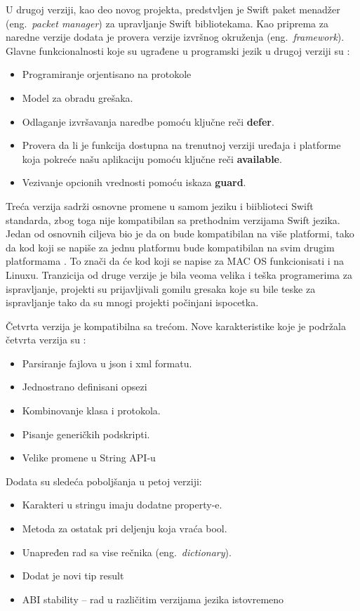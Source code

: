 \documentclass[a4paper]{article}
\begin{document}
U drugoj verziji, kao deo novog projekta, predstvljen je Swift paket menadžer (eng.~{\em packet manager}) za upravljanje Swift bibliotekama. Kao priprema za naredne verzije dodata je provera verzije izvršnog okruženja (eng.~{\em framework}). Glavne funkcionalnosti koje su ugrađene u programski jezik u drugoj verziji su \cite{swiftdev_sajt}:
\begin{itemize}
\item Programiranje orjentisano na protokole
\item Model za obradu grešaka.
\item Odlaganje izvršavanja naredbe pomoću ključne reči \textbf{ defer}.
\item Provera da li je funkcija dostupna na trenutnoj verziji uređaja i platforme koja pokreće našu aplikaciju pomoću ključne reči \textbf{available}.
\item Vezivanje opcionih vrednosti pomoću iskaza \textbf{guard}. 
\end{itemize}

Treća verzija sadrži osnovne promene u samom jeziku i biiblioteci Swift standarda, zbog toga nije kompatibilan sa prethodnim verzijama Swift jezika. Jedan od osnovnih ciljeva bio je da on bude kompatibilan na više platformi, tako da kod koji se napiše za jednu platformu bude kompatibilan na svim drugim platformama \cite{mastering_swift3_sajt}. To znači da će kod koji se napise za MAC OS funkcionisati i na Linuxu. Tranzicija od druge verzije je bila veoma velika i teška programerima za ispravljanje, projekti su prijavljivali gomilu gresaka koje su bile teske za ispravljanje tako da su mnogi projekti počinjani ispocetka.

Četvrta verzija je kompatibilna sa trećom. Nove karakteristike koje je podržala četvrta verzija su \cite{swiftdev_sajt}:
\begin{itemize}
\item Parsiranje fajlova u json i xml formatu.
\item Jednostrano definisani opsezi
\item Kombinovanje klasa i protokola.
\item Pisanje generičkih podskripti.
\item Velike promene u String API-u
\end{itemize}

Dodata su sledeća poboljšanja u petoj verziji:
\begin{itemize}
\item Karakteri u stringu imaju dodatne property-e.
\item Metoda za ostatak pri deljenju koja vraća bool.
\item Unapređen rad sa vise rečnika (eng.~{\em dictionary}).
\item Dodat je novi tip result 
\item ABI stability – rad u različitim verzijama jezika istovremeno
\end{itemize}
  
\end{document}
